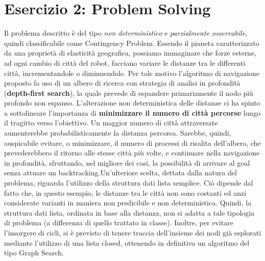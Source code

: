 	\section{Esercizio 2: Problem Solving}
		\label{sec:es2}
		Il problema descritto è del tipo \emph{non deterministico} e \emph{parzialmente osservabile}, quindi classificabile come \textsf{Contingency Problem}.
		Essendo il pianeta caratterizzato da una proprietà di
		elasticità geografica, possiamo immaginare che forze esterne,
		ad ogni cambio di città del robot, facciano variare le
		distanze tra le differenti città, incrementandole o
		diminuendole. Per tale motivo l’algoritmo di navigazione
		proposto fa uso di un albero di ricerca con strategia di
		analisi in profondità (\textbf{depth-first search}), la quale
		prevede di espandere primariamente il nodo più profondo non espanso.
		\newline
		 L'alterazione non deterministica delle distanze ci ha spinto a sottolineare l'importanza di \textbf{minimizzare il numero di città percorse} lungo il tragitto verso l'obiettivo. Un maggior numero di città attraversate aumenterebbe probabilisticamente la distanza percorsa. Sarebbe, quindi, auspicabile evitare, o minimizzare, il numero di processi di risalita dell'albero, che prevederebbero il ritorno alle stesse città più volte, e continuare nella navigazione in profondità, sfruttando, nel migliore dei casi, la possibilità di arrivare al \textsf{goal} senza attuare un \textsf{backtracking}.Un’ulteriore scelta, dettata dalla natura del problema, riguarda l’utilizzo
		 della struttura dati lista semplice. Ciò dipende dal fatto che, in questo
		 esempio, le distanze tra le città non sono costanti ed anzi considerate varianti
		 in maniera non predicibile e non deterministica. Quindi, la struttura dati
		 lista, ordinata in base alla distanza, non si adatta a tale tipologia di
		 problema (a differenza di quello trattato in classe).
		 Inoltre, per evitare l’insorgere di cicli, si è previsto di tenere traccia
		 dell’insieme dei nodi già esplorati mediante l’utilizzo di una lista \textsf{closed},
		 ottenendo in definitiva un algoritmo del tipo \textsf{Graph Search}. %
